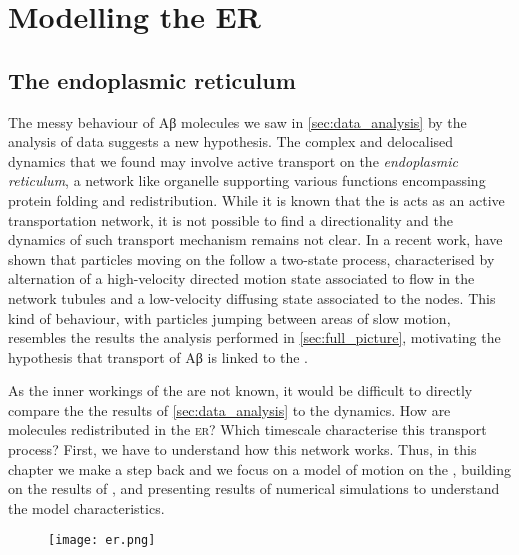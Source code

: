 
\chapter{Modelling the ER}\label{sec:modelling}

\section{The endoplasmic reticulum}

The messy behaviour of Aβ molecules we saw in \cref{sec:data_analysis} by the analysis of  data suggests a new hypothesis. The complex and delocalised dynamics that we found may involve active transport on the \emph{endoplasmic reticulum}, a network like organelle supporting various functions encompassing protein folding and redistribution. While it is known that the  is acts as an active transportation network, it is not possible to find a directionality and the dynamics of such transport mechanism remains not clear.
In a recent work, \citeauthor{holcman2018single} have shown that particles moving on the  follow a two-state process, characterised by alternation of a high-velocity directed motion state associated to flow in the network tubules and a low-velocity diffusing state associated to the nodes. This kind of behaviour, with particles jumping between areas of slow motion, resembles the results the analysis performed in \cref{sec:full_picture}, motivating the hypothesis that transport of Aβ is linked to the .

As the inner workings of the  are not known, it would be difficult to directly compare the the results of \cref{sec:data_analysis} to the  dynamics. How are molecules redistributed in the \textsc{er}? Which timescale characterise this transport process? First, we have to understand how this network works. Thus, in this chapter we make a step back and we focus on a model of motion on the , building on the results of \citeauthor{holcman2018single}, and presenting results of numerical simulations to understand the model characteristics.

\begin{figure}[t!]
  \texttt{[image: er.png]}
\end{figure}

